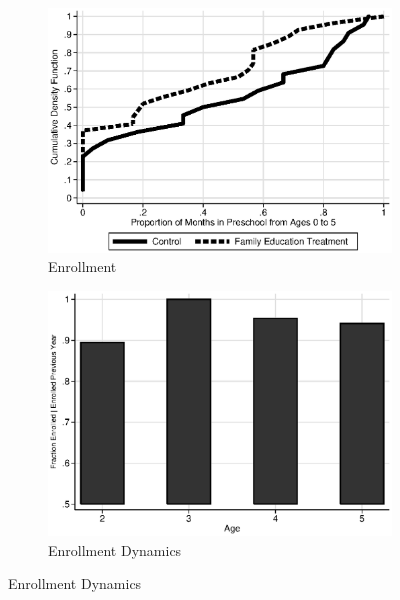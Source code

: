 \begin{figure}
\centering
\caption{Control Substitution Characteristics, ABC/CARE Control Group}\label{fig:control-sub}
\begin{subfigure}[h]{0.4\textwidth}
		\centering
		\caption{Enrollment} \label{fig:treatsubcare}
		\includegraphics[width=\textwidth]{output/care_controlcontamination_months.eps}
\end{subfigure}%
\begin{subfigure}[h]{0.4\textwidth}
		\centering
		\caption{Enrollment Dynamics} \label{fig:treatsubcare_2}
		\includegraphics[width=\textwidth]{output/abccare_Vprobs.eps}
\end{subfigure}


\end{figure}
